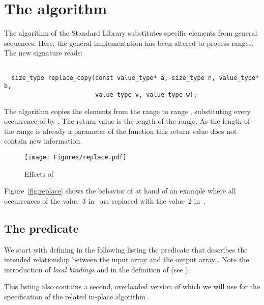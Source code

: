 
\section{The \replacecopy algorithm}

The \replacecopy algorithm of the \cxx Standard Library \cite[\S 28.6.5]{cxx-17-draft} substitutes
specific elements from general sequences.
%
Here, the general implementation
has been altered to process  ranges.
The new signature reads:

\begin{lstlisting}[style=acsl-block]

  size_type replace_copy(const value_type* a, size_type n, value_type* b,
                         value_type v, value_type w);
\end{lstlisting}

The \replacecopy algorithm copies the elements from the range 
to range {}, substituting every occurrence of  by .
The return value is the length of the range.
As the length of the range is already a parameter of
the function this return value does not contain new
information.


\begin{figure}[hbt]
\centering
\texttt{[image: Figures/replace.pdf]}
\caption{ Effects of \replace}
\end{figure}

Figure~\ref{fig:replace} shows the behavior of \replacecopy at hand of an example
where all occurrences of the value~3 in~ are replaced with the
value~2 in~.


\subsection{The predicate \Replace}

We start with defining in the following listing the predicate 
that describes the intended relationship between the input array 
and the output array .
Note the introduction of \emph{local bindings} 
and  in the definition of \Replace (see \cite[\S 2.2]{ACSLSpec}).



This listing also contains a second, overloaded version of \Replace
which we will use for the specification of the related in-place
algorithm .

